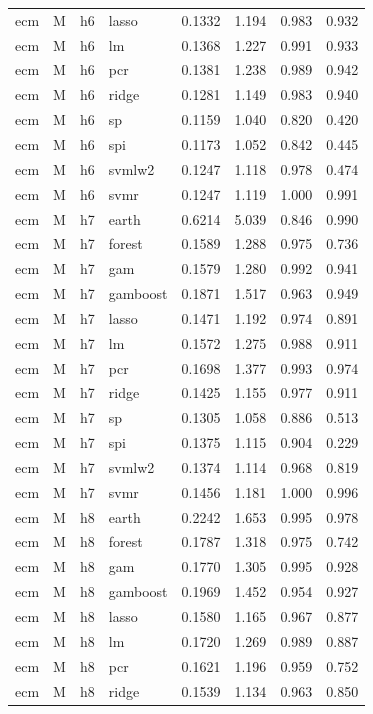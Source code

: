 \begin{ThreePartTable}
\begin{longtable}[t]{llclcccc}
ecm & M & h6 & lasso & 0.1332 & 1.194 & 0.983 & 0.932\\
ecm & M & h6 & lm & 0.1368 & 1.227 & 0.991 & 0.933\\
ecm & M & h6 & pcr & 0.1381 & 1.238 & 0.989 & 0.942\\
ecm & M & h6 & ridge & 0.1281 & 1.149 & 0.983 & 0.940\\
ecm & M & h6 & sp & 0.1159 & 1.040 & 0.820 & 0.420\\
ecm & M & h6 & spi & 0.1173 & 1.052 & 0.842 & 0.445\\
ecm & M & h6 & svmlw2 & 0.1247 & 1.118 & 0.978 & 0.474\\
ecm & M & h6 & svmr & 0.1247 & 1.119 & 1.000 & 0.991\\
\addlinespace
ecm & M & h7 & earth & 0.6214 & 5.039 & 0.846 & 0.990\\
ecm & M & h7 & forest & 0.1589 & 1.288 & 0.975 & 0.736\\
ecm & M & h7 & gam & 0.1579 & 1.280 & 0.992 & 0.941\\
ecm & M & h7 & gamboost & 0.1871 & 1.517 & 0.963 & 0.949\\
ecm & M & h7 & lasso & 0.1471 & 1.192 & 0.974 & 0.891\\
ecm & M & h7 & lm & 0.1572 & 1.275 & 0.988 & 0.911\\
ecm & M & h7 & pcr & 0.1698 & 1.377 & 0.993 & 0.974\\
ecm & M & h7 & ridge & 0.1425 & 1.155 & 0.977 & 0.911\\
ecm & M & h7 & sp & 0.1305 & 1.058 & 0.886 & 0.513\\
ecm & M & h7 & spi & 0.1375 & 1.115 & 0.904 & 0.229\\
ecm & M & h7 & svmlw2 & 0.1374 & 1.114 & 0.968 & 0.819\\
ecm & M & h7 & svmr & 0.1456 & 1.181 & 1.000 & 0.996\\
\addlinespace
ecm & M & h8 & earth & 0.2242 & 1.653 & 0.995 & 0.978\\
ecm & M & h8 & forest & 0.1787 & 1.318 & 0.975 & 0.742\\
ecm & M & h8 & gam & 0.1770 & 1.305 & 0.995 & 0.928\\
ecm & M & h8 & gamboost & 0.1969 & 1.452 & 0.954 & 0.927\\
ecm & M & h8 & lasso & 0.1580 & 1.165 & 0.967 & 0.877\\
ecm & M & h8 & lm & 0.1720 & 1.269 & 0.989 & 0.887\\
ecm & M & h8 & pcr & 0.1621 & 1.196 & 0.959 & 0.752\\
ecm & M & h8 & ridge & 0.1539 & 1.134 & 0.963 & 0.850\\

\end{longtable}
\end{ThreePartTable}
